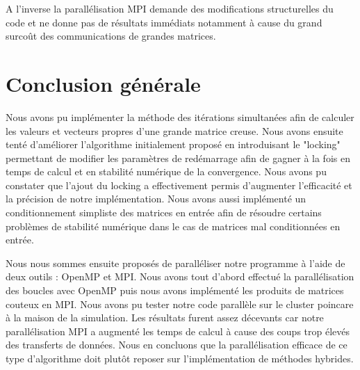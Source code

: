 \documentclass[11pt,a4paper]{article}
\begin{document}
	A l'inverse la parallélisation MPI demande des modifications structurelles du code et ne donne pas de résultats immédiats notamment à cause du grand surcoût des communications de grandes matrices.

\section{Conclusion générale}

	Nous avons pu implémenter la méthode des itérations simultanées afin de calculer les valeurs et vecteurs propres d'une grande matrice creuse. Nous avons ensuite tenté d'améliorer l'algorithme initialement proposé en introduisant le "locking" permettant de modifier les paramètres de redémarrage afin de gagner à la fois en temps de calcul et en stabilité numérique de la convergence. Nous avons pu constater que l'ajout du locking a effectivement permis d'augmenter l'efficacité et la précision de notre implémentation. Nous avons aussi implémenté un conditionnement simpliste des matrices en entrée afin de résoudre certains problèmes de stabilité numérique dans le cas de matrices mal conditionnées en entrée.

	Nous nous sommes ensuite proposés de paralléliser notre programme à l'aide de deux outils : OpenMP et MPI. Nous avons tout d'abord effectué la parallélisation des boucles avec OpenMP puis nous avons implémenté les produits de matrices couteux en MPI. Nous avons pu tester notre code parallèle sur le cluster poincare à la maison de la simulation. Les résultats furent assez décevants car notre parallélisation MPI a augmenté les temps de calcul à cause des coups trop élevés des transferts de données. Nous en concluons que la parallélisation efficace de ce type d'algorithme doit plutôt reposer sur l'implémentation de méthodes hybrides.
\end{document}
